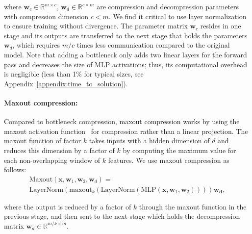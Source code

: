where $\mathbf{w}_c\in\mathbb{R}^{m\times c}$, $\mathbf{w}_d\in\mathbb{R}^{c\times m}$ are compression and decompression parameters with compression dimension $c<m$. We find it critical to use layer normalization \cite{ba2016layernorm} to ensure training without divergence. The parameter matrix $\mathbf{w}_c$ resides in one stage and its outputs are transferred to the next stage that holds the parameters $\mathbf{w}_d$, which requires $m/c$ times less communication compared to the original model. Note that adding a bottleneck only adds two linear layers for the forward pass and decreases the size of MLP activations; thus, its computational overhead is negligible (less than 1\% for typical sizes, see Appendix~\ref{appendix:time_to_solution}).

\paragraph{Maxout compression:} Compared to bottleneck compression, maxout compression works by using the maxout activation function~\citep{goodfellow2013maxout} for compression rather than a linear projection. The maxout function of factor $k$ takes inputs with a hidden dimension of $d$ and reduces this dimension by a factor of $k$ by computing the maximum value for each non-overlapping window of $k$ features. We use maxout compression as follows:
\begin{gather*}
    \text{Maxout}(\mathbf{x}, \mathbf{w}_1, \mathbf{w}_2, \mathbf{w}_d) = \\ \text{LayerNorm}(\text{maxout}_k(\text{LayerNorm}(\text{MLP}(\mathbf{x}, \mathbf{w}_1, \mathbf{w}_2))))\mathbf{w_d},
\end{gather*}

where the output is reduced by a factor of $k$ through the maxout function in the previous stage, and then sent to the next stage which holds the decompression matrix $\mathbf{w}_d{\in}\mathbb{R}^{m/k\times m}$.


